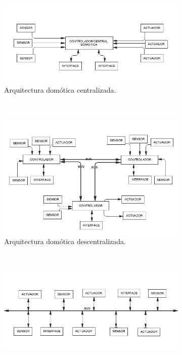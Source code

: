 \documentclass[11pt,letterpaper]{report}
\begin{document}
		\begin{figure}
    \centering
    \begin{subfigure}[b]{0.5\textwidth}
        \includegraphics[width=\textwidth]{imagenes/CETRALIZADA_.jpg}
        \caption{Arquitectura domótica centralizada. }
        \label{fig:centralizada}
    \end{subfigure}
    ~ %
    \begin{subfigure}[b]{0.44\textwidth}
        \includegraphics[width=\textwidth]{imagenes/DESCENTRALIZADA_.jpg}
        \caption{Arquitectura domótica descentralizada.}
        \label{fig:descentralizada}
    \end{subfigure}
    ~ %
    \begin{subfigure}[b]{0.5\textwidth}
        \includegraphics[width=\textwidth]{imagenes/DISTRIBUIDA_.jpg}

\end{subfigure}
\end{figure}
\end{document}
